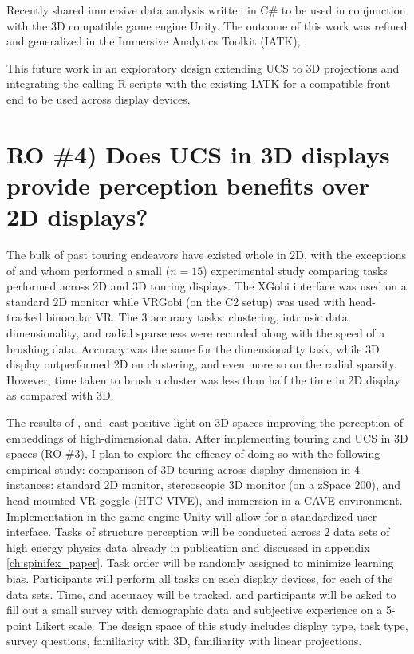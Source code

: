 \documentclass{monashthesis}
\begin{document}
Recently \textcite{cordeil_imaxes:_2017} shared immersive data analysis
written in C\# to be used in conjunction with the 3D compatible game
engine Unity. The outcome of this work was refined and generalized in
the Immersive Analytics Toolkit (IATK),
\textcite{cordeil_immersive_2019}.

This future work in an exploratory design extending UCS to 3D
projections and integrating the calling R scripts with the existing IATK
for a compatible front end to be used across display devices.

\section{RO \#4) Does UCS in 3D displays provide perception benefits
over 2D displays?}\label{UCS_3dvs2d}

The bulk of past touring endeavors have existed whole in 2D, with the
exceptions of \textcite{nelson_xgobi_1998} and
\textcite{arms_benefits_1999} whom performed a small (\(n=15\))
experimental study comparing tasks performed across 2D and 3D touring
displays. The XGobi interface was used on a standard 2D monitor while
VRGobi (on the C2 setup) was used with head-tracked binocular VR. The 3
accuracy tasks: clustering, intrinsic data dimensionality, and radial
sparseness were recorded along with the speed of a brushing data.
Accuracy was the same for the dimensionality task, while 3D display
outperformed 2D on clustering, and even more so on the radial sparsity.
However, time taken to brush a cluster was less than half the time in 2D
display as compared with 3D.

The results of \textcite{wagner_filho_immersive_2018},
\textcite{nelson_xgobi_1998} and, \textcite{arms_benefits_1999} cast
positive light on 3D spaces improving the perception of embeddings of
high-dimensional data. After implementing touring and UCS in 3D spaces
(RO \#3), I plan to explore the efficacy of doing so with the following
empirical study: comparison of 3D touring across display dimension in 4
instances: standard 2D monitor, stereoscopic 3D monitor (on a zSpace
200), and head-mounted VR goggle (HTC VIVE), and immersion in a CAVE
environment. Implementation in the game engine Unity will allow for a
standardized user interface. Tasks of structure perception will be
conducted across 2 data sets of high energy physics data already in
publication \autocites{wang_visualizing_2018}{cook_dynamical_2018} and
discussed in appendix \ref{ch:spinifex_paper}. Task order will be
randomly assigned to minimize learning bias. Participants will perform
all tasks on each display devices, for each of the data sets. Time, and
accuracy will be tracked, and participants will be asked to fill out a
small survey with demographic data and subjective experience on a
5-point Likert scale. The design space of this study includes display
type, task type, survey questions, familiarity with 3D, familiarity with
linear projections.
\end{document}

